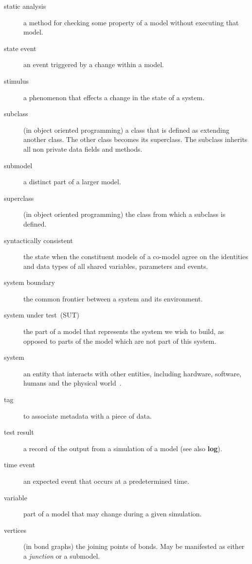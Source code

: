 \documentclass{crescendorepchap}
\begin{document}
\begin{description}
\item[static analysis] a method for checking some property of a model without executing that model.
\item[state event] an event triggered by a change within a model.
\item[stimulus] a phenomenon that effects a change in the state of a system.
\item[subclass] (in object oriented programming) a class that is defined as extending another class.  The other class becomes its superclass.  The subclass inherits all non private data fields and methods.
\item[submodel] a distinct part of a larger model.
\item[superclass] (in object oriented programming) the class from which a subclass is defined.
\item[syntactically consistent] the state when the constituent models of a co-model agree on the identities and data types of all shared variables, parameters and events.
\item[system boundary] the common frontier between a system and its environment.
\item[system under test~(SUT)] the part of a model that represents the system we wish to build, as opposed to parts of the model which are not part of this system.
\item[system] an entity that interacts with other entities, including hardware, software, humans and the physical world~\cite{Avizienis&04}.
\item[tag] to associate metadata with a piece of data.
\item[test result] a record of the output from a simulation of a model (see also \textbf{log}).
\item[time event] an expected event that occurs at a predetermined time.
\item[variable] part of a model that may change during a given simulation.
\item[vertices] (in bond graphs) the joining points of bonds.  May be manifested as either a \textit{junction} or a submodel.
\end{description} 
\end{document}
